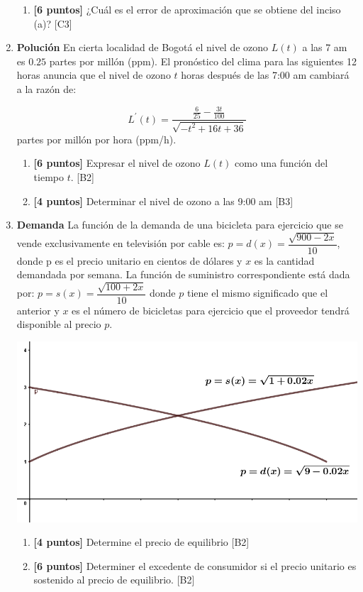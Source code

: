 \documentclass[10pt]{exam}
\begin{document}
\begin{enumerate}
\begin{enumerate}
     \item \textbf{[6 puntos]} ¿Cuál  es el error de aproximación  que se obtiene del inciso (a)? \hfill{[C3]}
     

\end{enumerate}


 \item  \textbf{Polución}
En cierta localidad de Bogotá el nivel de ozono $ L(t) $ a las  7 am  es $0.25$ partes por millón (ppm). El pronóstico del clima para las siguientes 12 horas anuncia que el nivel de ozono  $t$ horas después de las 7:00 am  cambiará a la razón de:  
	
		
	$$L^{\prime}(t)=\dfrac{\frac{6}{25}-\frac{3t}{100}}{\sqrt{-t^2+16t+36}}$$
	partes por millón por hora (ppm/h).
	
	\begin{enumerate}
		
		\item \textbf{[6 puntos]} Expresar el nivel de ozono $L(t)$ como una función del tiempo $t$.   \hfill{[B2]} 
		\item \textbf{[4 puntos]} Determinar  el nivel de ozono a las 9:00 am
		\hfill{[B3]} 

	\end{enumerate}	
	
\item  \textbf{Demanda}
 La función de la demanda de una bicicleta para ejercicio que se vende exclusivamente en televisión por cable es: $p=d(x)=\dfrac{\sqrt{900-2x}}{10} $, donde p es el precio unitario en cientos de dólares y $x$ es la cantidad demandada por semana. La función de suministro correspondiente está dada por: $p=s(x)=\dfrac{\sqrt{100+2x}}{10}$ donde $p$ tiene el mismo significado que el anterior y $x$ es el número de bicicletas para ejercicio que el proveedor tendrá disponible al precio $p$.
 
 \begin{center}
    \includegraphics[scale=0.5]{demanda.PNG}
\end{center}
 
 	\begin{enumerate}
		
		\item \textbf{[4 puntos]} Determine el precio de equilibrio  \hfill{[B2]} 
		\item \textbf{[6 puntos]} Determiner el excedente de consumidor si el precio unitario es sostenido al precio de equilibrio.
		\hfill{[B2]} 

	\end{enumerate}	


\end{enumerate}
\end{document}
